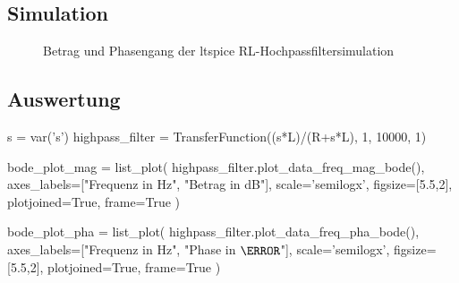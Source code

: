 \subsection{Simulation}


\begin{figure}[H]
    \centering
    \begin{subfigure}{\textwidth}
        \centering
    \end{subfigure}
    \quad
    \begin{subfigure}{\textwidth}
        \centering
    \end{subfigure}
    \caption{Betrag und Phasengang der ltspice RL-Hochpassfiltersimulation}
\end{figure}

\subsection{Auswertung}

\begin{sagesilent}
    s = var('s')
    highpass_filter = TransferFunction((s*L)/(R+s*L), 1, 10000, 1)

    bode_plot_mag = list_plot(
        highpass_filter.plot_data_freq_mag_bode(),
        axes_labels=["Frequenz in Hz", "Betrag in dB"],
        scale='semilogx',
        figsize=[5.5,2],
        plotjoined=True,
        frame=True
    )

    bode_plot_pha = list_plot(
        highpass_filter.plot_data_freq_pha_bode(),
        axes_labels=["Frequenz in Hz", "Phase in $\degree$"],
        scale='semilogx',
        figsize=[5.5,2],
        plotjoined=True,
        frame=True
    )
\end{sagesilent}

